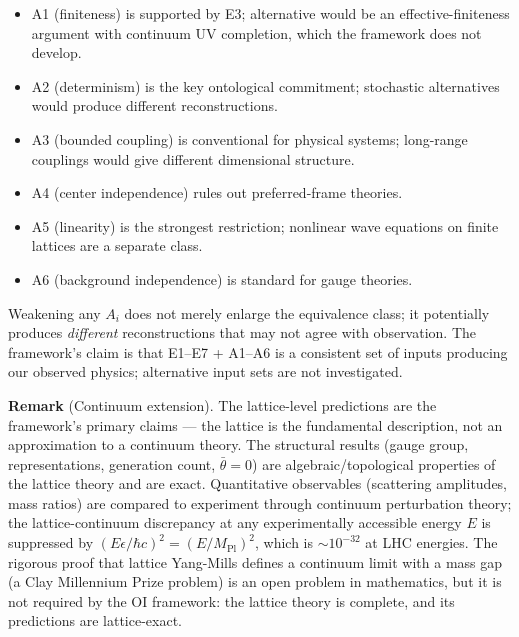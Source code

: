 \documentclass[
]{article}
\providecommand{\tightlist}{%
  \setlength{\itemsep}{0pt}\setlength{\parskip}{0pt}}
\begin{document}
\begin{itemize}
\tightlist
\item
  A1 (finiteness) is supported by E3; alternative would be an
  effective-finiteness argument with continuum UV completion, which the
  framework does not develop.
\item
  A2 (determinism) is the key ontological commitment; stochastic
  alternatives would produce different reconstructions.
\item
  A3 (bounded coupling) is conventional for physical systems; long-range
  couplings would give different dimensional structure.
\item
  A4 (center independence) rules out preferred-frame theories.
\item
  A5 (linearity) is the strongest restriction; nonlinear wave equations
  on finite lattices are a separate class.
\item
  A6 (background independence) is standard for gauge theories.
\end{itemize}

Weakening any \(A_i\) does not merely enlarge the equivalence class; it
potentially produces \emph{different} reconstructions that may not agree
with observation. The framework's claim is that E1--E7 + A1--A6 is a
consistent set of inputs producing our observed physics; alternative
input sets are not investigated.

\textbf{Remark} (Continuum extension). The lattice-level predictions are
the framework's primary claims --- the lattice is the fundamental
description, not an approximation to a continuum theory. The structural
results (gauge group, representations, generation count,
\(\bar\theta = 0\)) are algebraic/topological properties of the lattice
theory and are exact. Quantitative observables (scattering amplitudes,
mass ratios) are compared to experiment through continuum perturbation
theory; the lattice-continuum discrepancy at any experimentally
accessible energy \(E\) is suppressed by
\((E\epsilon/\hbar c)^2 = (E/M_{\text{Pl}})^2\), which is
\(\sim 10^{-32}\) at LHC energies. The rigorous proof that lattice
Yang-Mills defines a continuum limit with a mass gap (a Clay Millennium
Prize problem) is an open problem in mathematics, but it is not required
by the OI framework: the lattice theory is complete, and its predictions
are lattice-exact.
\end{document}
